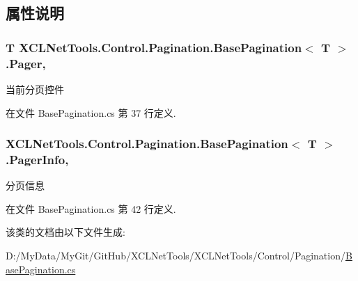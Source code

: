 \subsection{属性说明}
\hypertarget{class_x_c_l_net_tools_1_1_control_1_1_pagination_1_1_base_pagination_3_01_t_01_4_ae0cfdba3ea23387da4b851c4d695d0a0}{
\subsubsection[{Pager}]{\setlength{\rightskip}{0pt plus 5cm}T X\-C\-L\-Net\-Tools.\-Control.\-Pagination.\-Base\-Pagination$<$ T $>$.Pager\hspace{0.3cm}{\ttfamily [get]}, {\ttfamily [set]}}}\label{class_x_c_l_net_tools_1_1_control_1_1_pagination_1_1_base_pagination_3_01_t_01_4_ae0cfdba3ea23387da4b851c4d695d0a0}


当前分页控件 



在文件 Base\-Pagination.\-cs 第 37 行定义.

\hypertarget{class_x_c_l_net_tools_1_1_control_1_1_pagination_1_1_base_pagination_3_01_t_01_4_ae27d645cd692bb7471bc6236c59496a3}{
\subsubsection[{Pager\-Info}]{ X\-C\-L\-Net\-Tools.\-Control.\-Pagination.\-Base\-Pagination$<$ T $>$.Pager\-Info\hspace{0.3cm}{\ttfamily [get]}, {\ttfamily [set]}}}\label{class_x_c_l_net_tools_1_1_control_1_1_pagination_1_1_base_pagination_3_01_t_01_4_ae27d645cd692bb7471bc6236c59496a3}


分页信息 



在文件 Base\-Pagination.\-cs 第 42 行定义.



该类的文档由以下文件生成\-:\begin{DoxyCompactItemize}
\item 
D\-:/\-My\-Data/\-My\-Git/\-Git\-Hub/\-X\-C\-L\-Net\-Tools/\-X\-C\-L\-Net\-Tools/\-Control/\-Pagination/\hyperlink{_base_pagination_8cs}{Base\-Pagination.\-cs}\end{DoxyCompactItemize}
